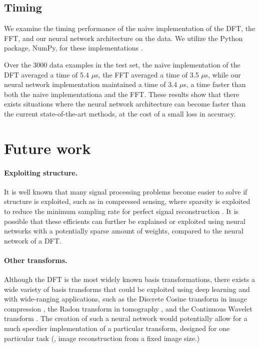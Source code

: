 \documentclass[12pt]{article}
\begin{document}
\subsection{Timing}
We examine the timing performance of the naive implementation of the DFT, the FFT, and our neural network architecture
on the data. We utilize the Python package, NumPy, for these implementations \cite{NUMPY}.

Over the 3000 data examples in the test set, the naive implementation of the DFT averaged a time of 5.4 $\mu$s,
the FFT averaged a time of 3.5 $\mu$s, while our neural network implementation maintained a time of 3.4 $\mu$s, a time
faster than both the naive implementationa and the FFT. These results show that there exists situations where the neural
network architecture can become faster than the current state-of-the-art methods, at the cost of a small loss in accuracy.

\section{Future work}

\paragraph{Exploiting structure.} It is well known that many signal processing problems become easier to solve if structure is
exploited, such as in compressed sensing, where sparsity is exploited to reduce the minimum sampling rate for perfect signal
reconstruction \cite{D:06}. It is possible that these efficients can further be explained or exploited using neural networks
with a potentially sparse amount of weights, compared to the neural network of a DFT.

\paragraph{Other transforms.} Although the DFT is the most widely known basis transformations, there exists a wide variety of
basis transforms that could be exploited using deep learning and with wide-ranging applications, such as the Discrete
Cosine transform in image compression \cite{ANR:74,YL:95}, the Radon transform in tomography \cite{D:07}, and the Continuous 
Wavelet transform \cite{M:08}. The creation of such a neural network would potentially allow for a much speedier implementation 
of a particular transform, designed for one particular task (\eg, image reconstruction from a fixed image size.)
\end{document}
